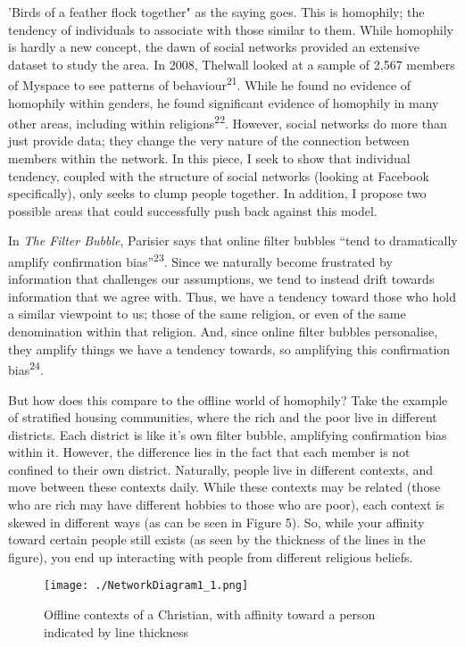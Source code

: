 \documentclass[]{article}
\begin{document}
'Birds of a feather flock together" as the saying goes. This is
homophily; the tendency of individuals to associate with those similar
to them. While homophily is hardly a new concept, the dawn of social
networks provided an extensive dataset to study the area. In 2008,
Thelwall looked at a sample of 2,567 members of Myspace to see patterns
of behaviour\textsuperscript{21}. While he found no evidence of
homophily within genders, he found significant evidence of homophily in
many other areas, including within religions\textsuperscript{22}.
However, social networks do more than just provide data; they change the
very nature of the connection between members within the network. In
this piece, I seek to show that individual tendency, coupled with the
structure of social networks (looking at Facebook specifically), only
seeks to clump people together. In addition, I propose two possible
areas that could successfully push back against this model.

In \emph{The Filter Bubble}, Parisier says that online filter bubbles
``tend to dramatically amplify confirmation bias''\textsuperscript{23}.
Since we naturally become frustrated by information that challenges our
assumptions, we tend to instead drift towards information that we agree
with. Thus, we have a tendency toward those who hold a similar viewpoint
to us; those of the same religion, or even of the same denomination
within that religion. And, since online filter bubbles personalise, they
amplify things we have a tendency towards, so amplifying this
confirmation bias\textsuperscript{24}.

But how does this compare to the offline world of homophily? Take the
example of stratified housing communities, where the rich and the poor
live in different districts. Each district is like it's own filter
bubble, amplifying confirmation bias within it. However, the difference
lies in the fact that each member is not confined to their own district.
Naturally, people live in different contexts, and move between these
contexts daily. While these contexts may be related (those who are rich
may have different hobbies to those who are poor), each context is
skewed in different ways (as can be seen in Figure 5). So, while your
affinity toward certain people still exists (as seen by the thickness of
the lines in the figure), you end up interacting with people from
different religious beliefs.

\begin{figure}
\centering
\texttt{[image: ./NetworkDiagram1\_1.png]}
\caption{Offline contexts of a Christian, with affinity toward a person
indicated by line thickness}
\end{figure}
\end{document}

